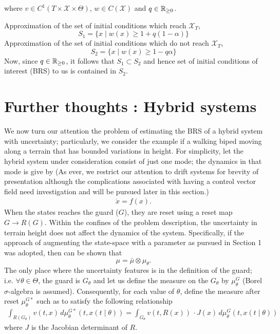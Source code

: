 \documentclass[10pt]{scrartcl}
\theoremstyle{remark}
\providecommand{\R}{\ensuremath \mathbb{R}}
\begin{document}
where $v\in C^1(T\times \mathcal X\times \Theta)$, $w\in C(\mathcal X)$ and $q\in \R_{\ge 0}$.\par
Approximation of the set of initial conditions which reach $\mathcal X_T$,
$$S_1=\{x\mid w(x)\ge 1+q(1-\alpha)\}$$
Approximation of the set of initial conditions which do not reach $\mathcal X_T$,
$$S_2=\{x\mid w(x)\ge 1-q\alpha\}$$
Now, since $q\in \R_{\ge 0}$, it follows that $S_1\subset S_2$ and hence set of initial conditions of interest (BRS) to us is contained in $S_2$.

\newpage

\section{Further thoughts : Hybrid systems}
We now turn our attention the problem of estimating the BRS of a hybrid system with uncertainty; particularly, we consider the example if a walking biped moving along a terrain that has bounded variations in height. For simplicity, let the hybrid system under consideration consist of just one mode; the dynamics in that mode is give by (As ever, we restrict our attention to drift systems for brevity of presentation although the complications associated with having a control vector field need investigation and will be pursued later in this section.)
\begin{align}
\dot x=f(x).
\end{align}
When the states reaches the guard ($G$), they are reset using a reset map $G\rightarrow R(G)$. Within the confines of the problem description, the uncertainty in terrain height does not affect the dynamics of the system. Specifically, if the approach of augmenting the state-space with a parameter as pursued in Section 1 was adopted, then can be shown that $$\mu=\bar\mu\otimes \mu_\theta.$$
The only place where the uncertainty features is in the definition of the guard; i.e. $\forall \theta\in \Theta$, the guard is $G_\theta$ and let us define the measure on the $G_\theta$ by $\mu^G_\theta$ (Borel $\sigma$-algebra is assumed). Consequently, for each value of $\theta$, define the measure after reset $\mu^{G*}_{\theta}$ such as to satisfy the following relationship
\begin{align}
	\int_{R(G_\theta)} v(t,x)\,d\mu_{\theta}^{G*}(t,x(t\mid \theta))=\int_{G_\theta}v(t,R(x))\,\cdot J(x)\,d\mu_\theta^G(t,x(t\mid \theta))
\end{align}
where $J$ is the Jacobian determinant of $R$.
\par
\end{document}
